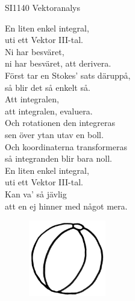 \documentclass[a6paper, 10pt, twoside]{article}
\begin{document}
\noindent
\begin{center}
\footnotesize SI1140 Vektoranalys\\
\end{center}
\begin{lyrics}
En liten enkel integral, \\
uti ett Vektor III-tal. \\
Ni har besväret, \\
ni har besväret, att derivera. 
\vspace{5pt} \\
Först tar en Stokes' sats däruppå, \\
så blir det så enkelt så. \\
Att integralen, \\
att integralen, evaluera. 
\vspace{5pt} \\
Och rotationen den integreras \\
sen över ytan utav en boll. \\
Och koordinaterna transformeras \\
så integranden blir bara noll. 
\vspace{5pt} \\
En liten enkel integral, \\
uti ett Vektor III-tal. \\
Kan va' så jävlig \\
att en ej hinner med något mera. 
\end{lyrics}
\begin{figure}[!h]
\hspace{120pt}\includegraphics[width=0.3\textwidth]{boll.jpg}
\end{figure}
\end{document}
